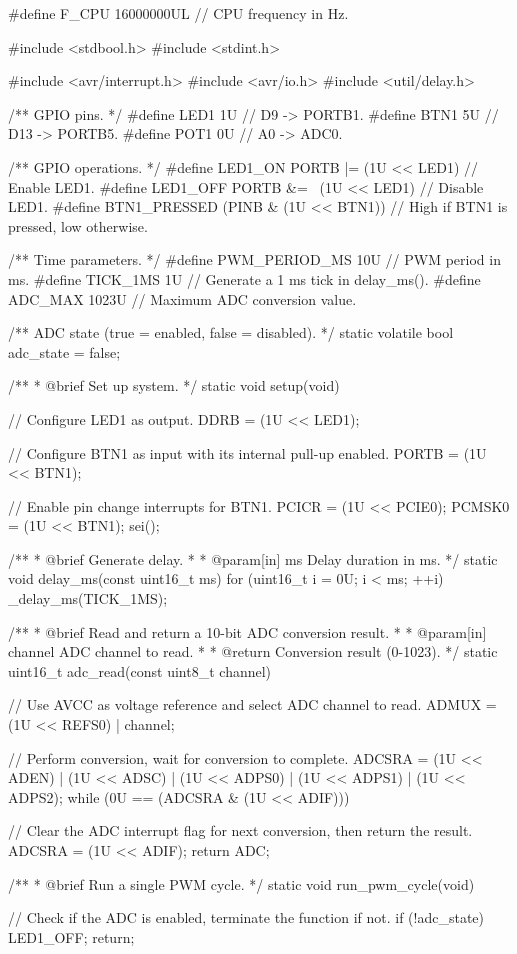 \begin{ccode}
#define F_CPU 16000000UL // CPU frequency in Hz.

#include <stdbool.h>
#include <stdint.h>

#include <avr/interrupt.h>
#include <avr/io.h>
#include <util/delay.h>

/** GPIO pins. */
#define LED1 1U // D9  -> PORTB1.
#define BTN1 5U // D13 -> PORTB5.
#define POT1 0U // A0  -> ADC0.

/** GPIO operations. */
#define LED1_ON PORTB |= (1U << LED1)      // Enable LED1.
#define LED1_OFF PORTB &= ~(1U << LED1)    // Disable LED1.
#define BTN1_PRESSED (PINB & (1U << BTN1)) // High if BTN1 is pressed, low otherwise.

/** Time parameters. */
#define PWM_PERIOD_MS 10U // PWM period in ms.
#define TICK_1MS 1U       // Generate a 1 ms tick in delay_ms().
#define ADC_MAX 1023U     // Maximum ADC conversion value.

/** ADC state (true = enabled, false = disabled). */
static volatile bool adc_state = false;

/**
 * @brief Set up system.
 */
static void setup(void)
{
    // Configure LED1 as output.
    DDRB = (1U << LED1);

    // Configure BTN1 as input with its internal pull-up enabled.
    PORTB = (1U << BTN1);

    // Enable pin change interrupts for BTN1.
    PCICR  = (1U << PCIE0);
    PCMSK0 = (1U << BTN1);
    sei();
}

/**
 * @brief Generate delay.
 *
 * @param[in] ms Delay duration in ms.
 */
static void delay_ms(const uint16_t ms)
{
    for (uint16_t i = 0U; i < ms; ++i)
    {
        _delay_ms(TICK_1MS);
    }
}

/**
 * @brief Read and return a 10-bit ADC conversion result.
 *
 * @param[in] channel ADC channel to read.
 *
 * @return Conversion result (0-1023).
 */
static uint16_t adc_read(const uint8_t channel)
{
    // Use AVCC as voltage reference and select ADC channel to read.
    ADMUX = (1U << REFS0) | channel;

    // Perform conversion, wait for conversion to complete.
    ADCSRA = (1U << ADEN) | (1U << ADSC) | (1U << ADPS0) | (1U << ADPS1) | (1U << ADPS2);
    while (0U == (ADCSRA & (1U << ADIF))) {}

    // Clear the ADC interrupt flag for next conversion, then return the result.
    ADCSRA = (1U << ADIF);
    return ADC;
}

/**
 * @brief Run a single PWM cycle.
 */
static void run_pwm_cycle(void)
{
    // Check if the ADC is enabled, terminate the function if not.
    if (!adc_state)
    {
        LED1_OFF;
        return;
    }

}
\end{ccode}
